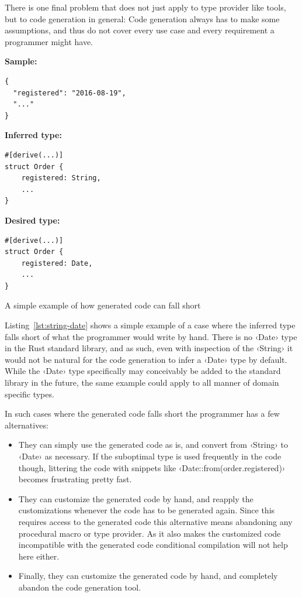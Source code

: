 There is one final problem that does not just apply to type provider like tools, but to code generation in general: Code generation always has to make some assumptions, and thus do not cover every use case and every requirement a programmer might have.

\begin{listing}[ht!]
\textbf{Sample:}
\begin{verbatim}
{
  "registered": "2016-08-19",
  "..."
}
\end{verbatim}
\vspace{5mm}

\textbf{Inferred type:}
\begin{verbatim}
#[derive(...)]
struct Order {
    registered: String,
    ...
}
\end{verbatim}
\vspace{5mm}

\textbf{Desired type:}
\begin{verbatim}
#[derive(...)]
struct Order {
    registered: Date,
    ...
}
\end{verbatim}
\caption{A simple example of how generated code can fall short}
\label{lst:string-date}
\end{listing}

Listing~\ref{lst:string-date} shows a simple example of a case where the inferred type falls short of what the programmer would write by hand. There is no ‹Date› type in the Rust standard library, and as such, even with inspection of the ‹String› it would not be natural for the code generation to infer a ‹Date› type by default. While the ‹Date› type specifically may conceivably be added to the standard library in the future, the same example could apply to all manner of domain specific types.

In such cases where the generated code falls short the programmer has a few alternatives:

\begin{itemize}
  \item They can simply use the generated code as is, and convert from ‹String› to ‹Date› as necessary. If the suboptimal type is used frequently in the code though, littering the code with snippets like ‹Date::from(order.registered)› becomes frustrating pretty fast.
  \item They can customize the generated code by hand, and reapply the customizations whenever the code has to be generated again. Since this requires access to the generated code this alternative means abandoning any procedural macro or type provider. As it also makes the customized code incompatible with the generated code conditional compilation will not help here either.
  \item Finally, they can customize the generated code by hand, and completely abandon the code generation tool.
\end{itemize}

